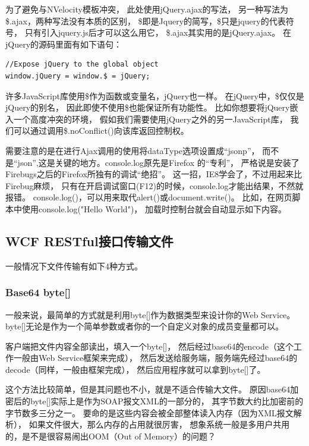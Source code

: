 \documentclass{book}
\begin{document}
为了避免与NVelocity模板冲突，
此处使用jQuery.ajax的写法，
另一种写法为\$.ajax，两种写法没有本质的区别，
\$即是Jquery的简写，\$只是jquery的代表符号，
只有引入jquery.js后才可以这么用它，
\$.ajax其实用的是jQuery.ajax。
在jQuery的源码里面有如下语句：

\begin{lstlisting}[language=VBScript]
//Expose jQuery to the global object
window.jQuery = window.$ = jQuery;
\end{lstlisting}

许多JavaScript库使用\$作为函数或变量名，jQuery也一样。
在jQuery中，\$仅仅是jQuery的别名，
因此即使不使用\$也能保证所有功能性。
比如你想要将jQuery嵌入一个高度冲突的环境，
假如我们需要使用jQuery之外的另一JavaScript库，
我们可以通过调用\$.noConflict()向该库返回控制权。

需要注意的是在进行Ajax调用的使用将dataType选项设置成“jsonp”，
而不是“json”,这是关键的地方。console.log原先是Firefox 的“专利”，
严格说是安装了Firebugs之后的Firefox所独有的调试“绝招”。
这一招，IE8学会了，不过用起来比Firebug麻烦，
只有在开启调试窗口(F12)的时候，console.log才能出结果，不然就报错。
console.log()，可以用来取代alert()或document.write()。
比如，在网页脚本中使用console.log("Hello World")，
加载时控制台就会自动显示如下内容。

\subsection{WCF RESTful接口传输文件}

一般情况下文件传输有如下4种方式。

\subsubsection{Base64 byte[]}
一般来说，最简单的方式就是利用byte[]作为数据类型来设计你的Web Service。
byte[]无论是作为一个简单参数或者你的一个自定义对象的成员变量都可以。

客户端把文件内容全部读出，填入一个byte[]，
然后经过base64的encode（这个工作一般由Web Service框架来完成），
然后发送给服务端，服务端先经过base64的decode（同样，一般由框架完成），
然后应用程序就可以拿到byte[]了。

这个方法比较简单，但是其问题也不小，就是不适合传输大文件。
原因base64加密后的byte[]实际上是作为SOAP报文XML的一部分的，
其字节数大约比加密前的字节数多三分之一。
要命的是这些内容会被全部整体读入内存（因为XML报文解析），
如果文件很大，那么内存的占用就很厉害，
想象系统一般是多用户共用的，是不是很容易闹出OOM（Out of Memory）的问题？
\end{document}
